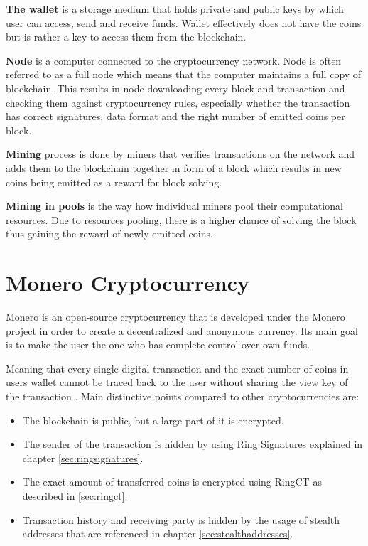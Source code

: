 \documentclass[
  printed, %
  table,   %
  nolof,     %
  nolot,     %
           oneside, color
]{fithesis3}
\begin{document}
\textbf{The wallet} is a storage medium that holds private and public keys by which user can access, send and receive funds. Wallet effectively does not have the coins but is rather a key to access them from the blockchain.

\textbf{Node} is a computer connected to the cryptocurrency network. Node is often referred to as a full node which means that the computer maintains a full copy of blockchain. This results in node downloading every block and transaction and checking them against cryptocurrency rules, especially whether the transaction has correct signatures, data format and the right number of emitted coins per block.

\textbf{Mining} process is done by miners that verifies transactions on the network and adds them to the blockchain together in form of a block which results in new coins being emitted as a reward for block solving.

\textbf{Mining in pools} is the way how individual miners pool their computational resources. Due to resources pooling, there is a higher chance of solving the block thus gaining the reward of newly emitted coins. %

\chapter{Monero Cryptocurrency}
Monero is an open-source cryptocurrency that is developed under the Monero project in order to create a decentralized and anonymous currency. Its main goal is to make the user the one who has complete control over own funds.

Meaning that every single digital transaction and the exact number of coins in users wallet cannot be traced back to the user without sharing the view key of the transaction \cite{moneroprojectgithub}. Main distinctive points compared to other cryptocurrencies are:

\begin{itemize}\itemsep0em
\item The blockchain is public, but a large part of it is encrypted.
\item The sender of the transaction is hidden by using Ring Signatures explained in chapter  \ref{sec:ringsignatures}.
\item The exact amount of transferred coins is encrypted using RingCT as described in \ref{sec:ringct}.
\item Transaction history and receiving party is hidden by the usage of stealth addresses that are referenced in chapter \ref{sec:stealthaddresses}.
\end{itemize}
\end{document}
